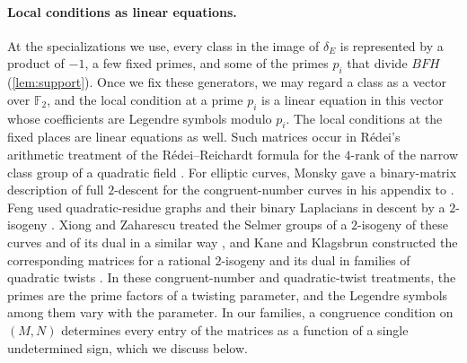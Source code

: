 \documentclass[12pt,oneside,openany]{book}
\theoremstyle{definition}
\theoremstyle{plain}
\numberwithin{equation}{chapter}
\theoremstyle{plain}
\theoremstyle{definition}
\theoremstyle{remark}
\newcommand{\F}{\mathbb F}
\begin{document}
\paragraph{Local conditions as linear equations.} At the specializations we use, every class in the image of $\delta_E$ is represented by a product of $-1$, a few fixed primes, and some of the primes $p_i$ that divide $BFH$ (\cref{lem:support}). Once we fix these generators, we may regard a class as a vector over $\F_2$, and the local condition at a prime $p_i$ is a linear equation in this vector whose coefficients are Legendre symbols modulo $p_i$. The local conditions at the fixed places are linear equations as well. Such matrices occur in R\'edei's arithmetic treatment \cite[\S5 and p.~59, footnote~11]{Redei1934} of the R\'edei--Reichardt formula for the $4$-rank of the narrow class group of a quadratic field \cite{RedeiReichardt1934}. For elliptic curves, Monsky gave a binary-matrix description of full $2$-descent for the congruent-number curves in his appendix to \cite[pp.~365--369, especially p.~366]{HeathBrownMonsky1994}. Feng used quadratic-residue graphs and their binary Laplacians in descent by a $2$-isogeny \cite[\S\S2--3]{Feng1996}. Xiong and Zaharescu treated the Selmer groups of a $2$-isogeny of these curves and of its dual in a similar way \cite[\S3.1, Theorem~3]{XiongZaharescu2009}, and Kane and Klagsbrun constructed the corresponding matrices for a rational $2$-isogeny and its dual in families of quadratic twists \cite[\S4]{KaneKlagsbrun2017}. In these congruent-number and quadratic-twist treatments, the primes are the prime factors of a twisting parameter, and the Legendre symbols among them vary with the parameter. In our families, a congruence condition on $(M,N)$ determines every entry of the matrices as a function of a single undetermined sign, which we discuss below.
\end{document}
